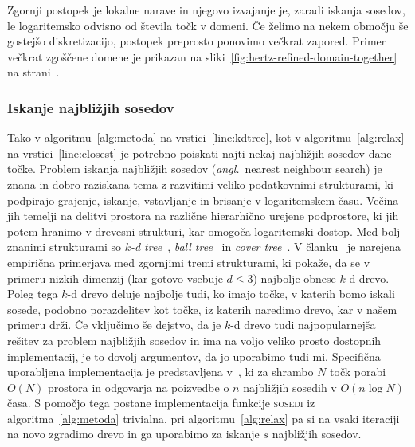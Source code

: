 \documentclass[12pt,a4paper,twoside]{article}
\theoremstyle{definition} %
\theoremstyle{plain} %
\numberwithin{equation}{section}
\newcommand{\ang}[1]{(\hspace{-1.5px}\textit{angl.}\ #1)}
\begin{document}
Zgornji postopek je lokalne narave in njegovo izvajanje je, zaradi iskanja sosedov, le logaritemsko
odvisno od števila točk v domeni. Če želimo na nekem območju še gostejšo diskretizacijo, postopek
preprosto ponovimo večkrat zapored. Primer večkrat zgoščene domene je prikazan na
sliki~\ref{fig:hertz-refined-domain-together} na strani~\pageref{fig:hertz-refined-domain-together}.

\subsubsection{Iskanje najbližjih sosedov}

Tako v algoritmu~\ref{alg:metoda} na vrstici~\ref{line:kdtree}, kot v algoritmu~\ref{alg:relax} na
vrstici~\ref{line:closest} je potrebno poiskati najti nekaj najbližjih sosedov dane točke. Problem
iskanja najbližjih sosedov \ang{nearest neighbour search} je znana in dobro raziskana tema z
razvitimi veliko podatkovnimi strukturami, ki podpirajo grajenje, iskanje, vstavljanje in brisanje v
logaritemskem času. Večina jih temelji na delitvi prostora na različne hierarhično urejene
podprostore, ki jih potem hranimo v drevesni strukturi, kar omogoča logaritemski dostop. Med
bolj znanimi strukturami so \emph{$k$-d tree}~\cite{moore1991intoductory}, \emph{ball
tree}~\cite{omohundro1989five} in \emph{cover tree}~\cite{beygelzimer2006cover}. V
članku~\cite{kibriya2007empirical} je narejena empirična primerjava med zgornjimi tremi strukturami,
ki pokaže, da se v primeru nizkih dimenzij (kar gotovo vsebuje $d \leq 3$) najbolje obnese
$k$-d drevo. Poleg tega $k$-d drevo deluje najbolje tudi, ko imajo točke, v katerih
bomo iskali sosede, podobno porazdelitev kot točke, iz katerih naredimo drevo, kar v našem
primeru drži. Če vključimo še dejstvo, da je $k$-d drevo tudi najpopularnejša rešitev za
problem najbližjih sosedov in ima na voljo veliko prosto dostopnih implementacij, je to dovolj
argumentov, da jo uporabimo tudi mi. Specifična uporabljena implementacija je predstavljena
v~\cite{mount1998ann}, ki za shrambo $N$ točk porabi $O(N)$ prostora in odgovarja na poizvedbe o $n$
najbližjih sosedih v $O(n\log N)$ časa. S pomočjo tega postane implementacija funkcije
\textsc{sosedi} iz algoritma~\ref{alg:metoda} trivialna, pri algoritmu~\ref{alg:relax} pa si na
vsaki iteraciji na novo zgradimo drevo in ga uporabimo za iskanje $s$ najbližjih sosedov.
\end{document}
